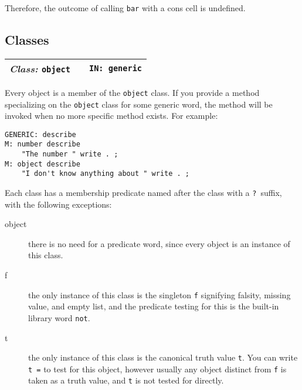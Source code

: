 \documentclass{report}
\newcommand{\classword}[2]{\index{#1}
\emph{Class:} \texttt{#1} &&\texttt{IN: #2}}
\newcommand{\wordtable}[1]{

\begin{tabularx}{12cm}[t]{lXr}
\hline
#1\\
\hline
\end{tabularx}

}
\begin{document}
Therefore, the outcome of calling \texttt{bar} with a cons cell is undefined.

\subsection{Classes}

\wordtable{
\classword{object}{generic}
}
Every object is a member of the \texttt{object} class. If you provide a method specializing
on the \texttt{object} class for some generic word, the method will be
invoked when no more specific method exists. For example:
\begin{verbatim}
GENERIC: describe
M: number describe
    "The number " write . ;
M: object describe
    "I don't know anything about " write . ;
\end{verbatim}
Each class has a membership predicate named
after the class with a \texttt{?}~suffix, with the following exceptions:
\begin{description}
\item[object] there is no need for a predicate word, since
every object is an instance of this class.
\item[f] the only instance of this class is the singleton
\texttt{f} signifying falsity, missing value, and empty list, and the predicate testing for this is the built-in library word \texttt{not}.
\item[t] the only instance of this class is the canonical truth value
\texttt{t}. You can write \texttt{t =} to test for this object, however usually
any object distinct from \texttt{f} is taken as a truth value, and \texttt{t} is not tested for directly.
\end{description}
\end{document}

